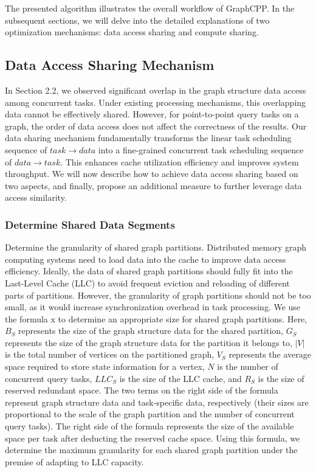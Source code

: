 \documentclass[lettersize,journal]{IEEEtran} %
\begin{document}
The presented algorithm illustrates the overall workflow of GraphCPP. In the subsequent sections, we will delve into the detailed explanations of two optimization mechanisms: data access sharing and compute sharing.

\subsection{Data Access Sharing Mechanism}
In Section 2.2, we observed significant overlap in the graph structure data access among concurrent tasks. Under existing processing mechanisms, this overlapping data cannot be effectively shared. However, for point-to-point query tasks on a graph, the order of data access does not affect the correctness of the results. Our data sharing mechanism fundamentally transforms the linear task scheduling sequence of $task → data$ into a fine-grained concurrent task scheduling sequence of $data → task$. This enhances cache utilization efficiency and improves system throughput. We will now describe how to achieve data access sharing based on two aspects, and finally, propose an additional measure to further leverage data access similarity.

\subsubsection{Determine Shared Data Segments}

Determine the granularity of shared graph partitions. Distributed memory graph computing systems need to load data into the cache to improve data access efficiency. Ideally, the data of shared graph partitions should fully fit into the Last-Level Cache (LLC) to avoid frequent eviction and reloading of different parts of partitions. However, the granularity of graph partitions should not be too small, as it would increase synchronization overhead in task processing. We use the formula x to determine an appropriate size for shared graph partitions. Here, $B_S$ represents the size of the graph structure data for the shared partition, $G_S$ represents the size of the graph structure data for the partition it belongs to, $|V|$ is the total number of vertices on the partitioned graph, $V_S$ represents the average space required to store state information for a vertex, $N$ is the number of concurrent query tasks, $LLC_S$ is the size of the LLC cache, and $R_S$ is the size of reserved redundant space. The two terms on the right side of the formula represent graph structure data and task-specific data, respectively (their sizes are proportional to the scale of the graph partition and the number of concurrent query tasks). The right side of the formula represents the size of the available space per task after deducting the reserved cache space. Using this formula, we determine the maximum granularity for each shared graph partition under the premise of adapting to LLC capacity.
\end{document}
